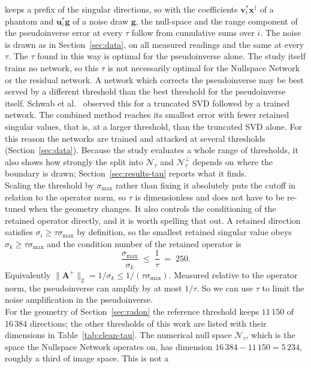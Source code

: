 \documentclass{article}
\numberwithin{equation}{section}
\begin{document}
keeps a prefix of the singular directions, so with the coefficients $\mathbf{v}_i^{*}\mathbf{x}^\dagger$
of a phantom and $\mathbf{u}_i^{*}\mathbf{g}$ of a noise draw $\mathbf{g}$, the null-space and the
range component of the pseudoinverse error at every $\tau$ follow from cumulative sums over $i$. The
noise is drawn as in Section~\ref{sec:data}, on all measured readings and the same at every $\tau$.
The $\tau$ found in this way is optimal for the pseudoinverse alone. The study itself trains no
network, so this $\tau$ is not necessarily optimal for the Nullspace Network or the residual network.
A network which corrects the pseudoinverse may be best served by a different threshold than the best threshold for the
pseudoinverse itself. Schwab et al.~\parencite{schwab2020bigjapan} observed this for a truncated SVD
followed by a trained network. The combined method reaches its smallest error with fewer retained
singular values, that is, at a larger threshold, than the truncated SVD alone.
For this reason the networks are trained and attacked at several thresholds (Section~\ref{sec:data}).
Because the study evaluates a whole range of thresholds, it also shows how strongly the split into
$\mathcal{N}_\tau$ and $\mathcal{N}_\tau^\perp$ depends on where the boundary is drawn;
Section~\ref{sec:results-tau} reports what it finds.\\
Scaling the threshold by $\sigma_{\max}$ rather than fixing
it absolutely puts the cutoff in relation to the operator norm, so $\tau$ is
dimensionless and does not have to be re-tuned when the geometry changes. It also controls the conditioning of
the retained operator directly, and it is worth spelling that out. A retained
direction satisfies $\sigma_i\geq\tau\sigma_{\max}$ by definition, so the
smallest retained singular value obeys $\sigma_k\geq\tau\sigma_{\max}$ and
the condition number of the retained operator is
\[\frac{\sigma_{\max}}{\sigma_k}\;\leq\;\frac{1}{\tau}\;=\;250 .\]
Equivalently $\lVert\mathbf{A}^{+}\rVert_2=1/\sigma_k\leq
1/(\tau\sigma_{\max})$. Measured relative to the operator norm, the
pseudoinverse can amplify by at most $1/\tau$.
So we can use $\tau$ to limit the noise amplification in the pseudoinverse.\\
For the geometry of Section~\ref{sec:radon} the reference threshold keeps $11\,150$ of $16\,384$ directions;
the other thresholds of this work are listed with their dimensions in Table~\ref{tab:clean-tau}. The numerical
null space $\mathcal{N}_\tau$, which is the space the Nullspace Network operates on, has
dimension $16\,384-11\,150=5\,234$, roughly a third of image space. This is not a
\end{document}
